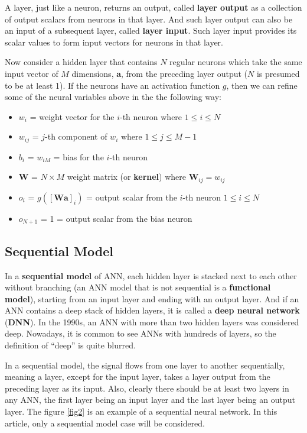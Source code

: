 \documentclass[letterpaper, 11pt]{article}
\numberwithin{equation}{section}
\numberwithin{figure}{section}
\numberwithin{table}{section}
\begin{document}
A layer, just like a neuron, returns an output, called \textbf{layer output} as a collection of output scalars from neurons in that layer. And such layer output can also be an input of a subsequent layer, called \textbf{layer input}. Such layer input provides its scalar values to form input vectors for neurons in that layer.

Now consider a hidden layer that contains \(N\) regular neurons which take the same input vector of \(M\) dimensions, \textbf{a}, from the preceding layer output (\(N\) is presumed to be at least 1). If the neurons have an activation function \(g\), then we can refine some of the neural variables above in the the following way:

\begin{itemize}
	\item \(w_{i}\) = weight vector for the \(i\)-th neuron where \(1 \le i \le N\)
	\item \(w_{ij}\) = \(j\)-th component of \(w_{i}\) where \(1 \le j \le M - 1\)
	\item \(b_{i}\) = \(w_{iM}\) = bias for the \(i\)-th neuron
	\item \textbf{W} = \(N \times M\) weight matrix (or \textbf{kernel}) where \(\textbf{W}_{ij} = w_{ij}\)  
	\item \(o_{i}\) = \(g([\textbf{Wa}]_{i})\) = output scalar from the \(i\)-th neuron \(1 \le i \le N\)
	\item \(o_{N+1}\) = 1 = output scalar from the bias neuron
\end{itemize}

\subsection{Sequential Model}
In a \textbf{sequential model} of ANN, each hidden layer is stacked next to each other without branching (an ANN model that is not sequential is a \textbf{functional model}), starting from an input layer and ending with an output layer. And if an ANN contains a deep stack of hidden layers, it is called a \textbf{deep neural network} (\textbf{DNN}). In the 1990s, an ANN with more than two hidden layers was considered deep. Nowadays, it is common to see ANNs with hundreds of layers, so the definition of “deep” is quite blurred.

In a sequential model, the signal flows from one layer to another sequentially, meaning a layer, except for the input layer, takes a layer output from the preceding layer as its input. Also, clearly there should be at least two layers in any ANN, the first layer being an input layer and the last layer being an output layer. The figure \ref{fig2} is an example of a sequential neural network. In this article, only a sequential model case will be considered.
\end{document}
